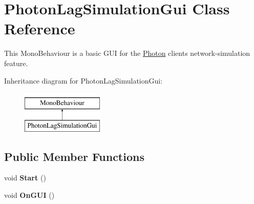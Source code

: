 \hypertarget{class_photon_lag_simulation_gui}{}\section{Photon\+Lag\+Simulation\+Gui Class Reference}
\label{class_photon_lag_simulation_gui}


This Mono\+Behaviour is a basic G\+UI for the \hyperlink{namespace_photon}{Photon} client\textquotesingle{}s network-\/simulation feature.  


Inheritance diagram for Photon\+Lag\+Simulation\+Gui\+:\begin{figure}[H]
\begin{center}
\leavevmode
\includegraphics[height=2.000000cm]{class_photon_lag_simulation_gui}
\end{center}
\end{figure}
\subsection*{Public Member Functions}
\begin{DoxyCompactItemize}
\item 
void {\bfseries Start} ()\hypertarget{class_photon_lag_simulation_gui_ab080d78f9ae59eeb2779b5e61be897bb}{}\label{class_photon_lag_simulation_gui_ab080d78f9ae59eeb2779b5e61be897bb}

\item 
void {\bfseries On\+G\+UI} ()\hypertarget{class_photon_lag_simulation_gui_abc9399cb95160e6994a1ad8661adbdc5}{}\label{class_photon_lag_simulation_gui_abc9399cb95160e6994a1ad8661adbdc5}

\end{DoxyCompactItemize}
